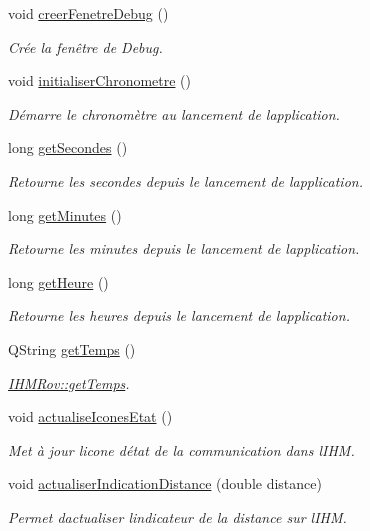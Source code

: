 \begin{DoxyCompactItemize}
void \hyperlink{class_i_h_m_rov_a30b49bada719a73e0899ad4bafb4de99}{creer\+Fenetre\+Debug} ()
\begin{DoxyCompactList}\small\item\em Crée la fenêtre de Debug. \end{DoxyCompactList}\item 
void \hyperlink{class_i_h_m_rov_a64002e867300c8aff2ebd4568acc107e}{initialiser\+Chronometre} ()
\begin{DoxyCompactList}\small\item\em Démarre le chronomètre au lancement de l\textquotesingle{}application. \end{DoxyCompactList}\item 
long \hyperlink{class_i_h_m_rov_ad28dd7ea40587335f6554de60c828524}{get\+Secondes} ()
\begin{DoxyCompactList}\small\item\em Retourne les secondes depuis le lancement de l\textquotesingle{}application. \end{DoxyCompactList}\item 
long \hyperlink{class_i_h_m_rov_ad6d275fe98c3dd1e40b2ef0defff3be9}{get\+Minutes} ()
\begin{DoxyCompactList}\small\item\em Retourne les minutes depuis le lancement de l\textquotesingle{}application. \end{DoxyCompactList}\item 
long \hyperlink{class_i_h_m_rov_a149d6d6325acf3f00bf025cb2fbac05f}{get\+Heure} ()
\begin{DoxyCompactList}\small\item\em Retourne les heures depuis le lancement de l\textquotesingle{}application. \end{DoxyCompactList}\item 
Q\+String \hyperlink{class_i_h_m_rov_aa6a269f311d527387ad3c9e22dd12d43}{get\+Temps} ()
\begin{DoxyCompactList}\small\item\em \hyperlink{class_i_h_m_rov_aa6a269f311d527387ad3c9e22dd12d43}{I\+H\+M\+Rov\+::get\+Temps}. \end{DoxyCompactList}\item 
void \hyperlink{class_i_h_m_rov_abbfcdc154a6ae7f941d186f6c90a5a2b}{actualise\+Icones\+Etat} ()
\begin{DoxyCompactList}\small\item\em Met à jour l\textquotesingle{}icone d\textquotesingle{}état de la communication dans l\textquotesingle{}I\+HM. \end{DoxyCompactList}\item 
void \hyperlink{class_i_h_m_rov_a7e55a10ef08b8a771fa692ec1d150d33}{actualiser\+Indication\+Distance} (double distance)
\begin{DoxyCompactList}\small\item\em Permet d\textquotesingle{}actualiser l\textquotesingle{}indicateur de la distance sur l\textquotesingle{}I\+HM. \end{DoxyCompactList}\end{DoxyCompactItemize}
